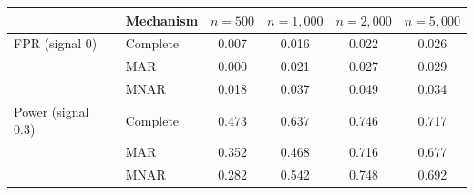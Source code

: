 \begin{tabular}{llcccc}
    \toprule
     & Mechanism & $n{=}500$ & $n{=}1{,}000$ & $n{=}2{,}000$ & $n{=}5{,}000$ \\
    \midrule
    FPR (signal 0)       & Complete  & 0.007 & 0.016 & 0.022 & 0.026 \\
                         & MAR       & 0.000 & 0.021 & 0.027 & 0.029 \\
                         & MNAR      & 0.018 & 0.037 & 0.049 & 0.034 \\
    \midrule
    Power (signal 0.3)   & Complete  & 0.473 & 0.637 & 0.746 & 0.717 \\
                         & MAR       & 0.352 & 0.468 & 0.716 & 0.677 \\
                         & MNAR      & 0.282 & 0.542 & 0.748 & 0.692 \\
    \bottomrule
\end{tabular}
